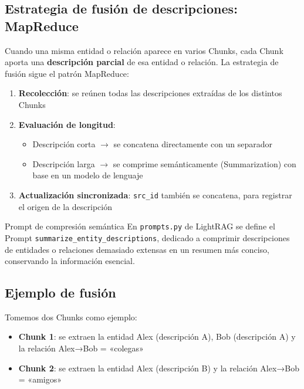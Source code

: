 \subsection{Estrategia de fusión de descripciones: MapReduce}

Cuando una misma entidad o relación aparece en varios Chunks, cada Chunk aporta una \textbf{descripción parcial} de esa entidad o relación. La estrategia de fusión sigue el patrón MapReduce:

\begin{enumerate}
    \item \textbf{Recolección}: se reúnen todas las descripciones extraídas de los distintos Chunks
    \item \textbf{Evaluación de longitud}:
    \begin{itemize}
        \item Descripción corta $\rightarrow$ se concatena directamente con un separador
        \item Descripción larga $\rightarrow$ se comprime semánticamente (Summarization) con base en un modelo de lenguaje
    \end{itemize}
    \item \textbf{Actualización sincronizada}: \texttt{src\_id} también se concatena, para registrar el origen de la descripción
\end{enumerate}

\begin{importantbox}{Prompt de compresión semántica}
En \texttt{prompts.py} de LightRAG se define el Prompt \texttt{summarize\_entity\_descriptions}, dedicado a comprimir descripciones de entidades o relaciones demasiado extensas en un resumen más conciso, conservando la información esencial.
\end{importantbox}

\subsection{Ejemplo de fusión}

Tomemos dos Chunks como ejemplo:
\begin{itemize}
    \item \textbf{Chunk 1}: se extraen la entidad Alex (descripción A), Bob (descripción A) y la relación Alex→Bob = «colegas»
    \item \textbf{Chunk 2}: se extraen la entidad Alex (descripción B) y la relación Alex→Bob = «amigos»
\end{itemize}

